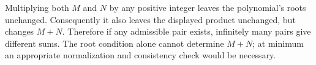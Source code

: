 Multiplying both $M$ and $N$ by any positive integer leaves the polynomial's roots unchanged. Consequently it also leaves the displayed product unchanged, but changes $M+N$. Therefore if any admissible pair exists, infinitely many pairs give different sums. The root condition alone cannot determine $M+N$; at minimum an appropriate normalization and consistency check would be necessary.
